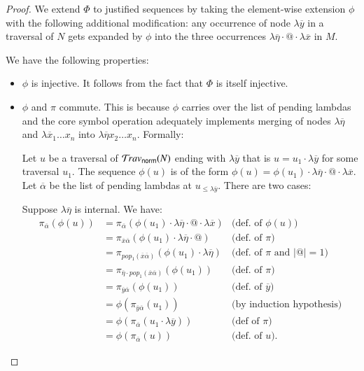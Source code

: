 \documentclass{elsarticle}
\theoremstyle{plain}
\theoremstyle{definition}
\newcommand{\normalizing}{{\sf norm}}
\newcommand{\travsetnorm}{\travset_\normalizing} %
\def\coresymbol{\pi} %
\begin{document}
\begin{proof}
    We extend $\Phi$ to justified sequences by taking the element-wise extension $\phi$ with the following additional modification: any occurrence of node $\lambda\overline{y}$ in a traversal of $N$ gets expanded by $\phi$ into the three occurrences $\lambda\overline\eta \cdot @ \cdot \lambda\overline{x}$ in $M$.

    We have the following properties:
    \begin{itemize}
    \item $\phi$ is injective. It follows from the fact that $\Phi$ is itself injective.

    \item $\phi$ and $\coresymbol$ commute. This is because $\phi$ carries over the list of pending lambdas and the core symbol operation adequately implements merging of nodes $\lambda\overline\eta$ and
    $\lambda\overline x_1 \ldots x_n$ into
    $\lambda\overline\eta x_2 \ldots x_n$. Formally:

    Let $u$ be a traversal of $\travsetnorm(N)$
    ending with $\lambda\overline{y}$ that is
    $u = u_1 \cdot \lambda\overline{y} $ for some traversal $u_1$.
    The sequence $\phi(u)$ is of the form
    $\phi(u) = \phi(u_1) \cdot \lambda\overline{\eta} \cdot @ \cdot \lambda\overline{x}$. Let $\overline\alpha$ be the list of pending lambdas at $u_{\leq \lambda\overline{y}}$. There are two cases:

    Suppose $\lambda\overline\eta$ is internal. We have:
    \begin{align*}
        \coresymbol_{\overline\alpha}(\phi(u))
        &=  \coresymbol_{\overline\alpha}(\phi(u_1) \cdot \lambda\overline{\eta} \cdot @ \cdot \lambda\overline{x})
            & \mbox{(def.~of $\phi(u)$)}
        \\
        &=  \coresymbol_{\overline{x}\overline\alpha}(\phi(u_1) \cdot
        \lambda\overline\eta \cdot @)
            & \mbox{(def.~of $\coresymbol$)}
        \\
        &=  \coresymbol_{pop_1(\overline{x}\overline\alpha)}(\phi(u_1) \cdot
        \lambda\overline{\eta})
            & \mbox{(def.~of $\coresymbol$ and $|@|=1$)}
        \\
        &=  \coresymbol_{\overline\eta \cdot pop_1(\overline{x}\overline\alpha)}(\phi(u_1))
            & \mbox{(def.~of $\coresymbol$)}
        \\
        &=  \coresymbol_{\overline{y}\overline\alpha}(\phi(u_1))
            & \mbox{(def.~of $\overline{y}$)}
        \\
        &=  \phi(\coresymbol_{\overline{y}\overline\alpha}(u_1))
            & \mbox{(by induction hypothesis)}
        \\
        &= \phi(\coresymbol_{\overline\alpha}(u_1 \cdot \lambda\overline{y})) & \mbox{(def of $\coresymbol$)} \\
        &=  \phi(\coresymbol_{\overline\alpha}(u))
            & \mbox{(def.~of $u$).}
    \end{align*}


\end{itemize}
\end{proof}
\end{document}
